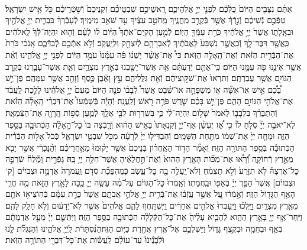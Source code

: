 \documentclass[twoside, openany, parskip=half, 11pt]{book}
\begin{document}
\begin{footnotesize}
\begin{multicols}{2}
\\
אַתֶּ֨ם נִצָּבִ֤ים הַיּוֹם֙ כֻּלְּֿכֶ֔ם לִפְנֵ֖י יְיָ֣ אֱלֹֽהֵיכֶ֑ם רָֽאשֵׁיכֶ֣ם שִׁבְטֵיכֶ֗ם זִקְנֵיכֶם֙ וְֿשֹׁ֣טְֿרֵיכֶ֔ם כֹּ֖ל אִ֥ישׁ יִשְׂרָאֵֽל׃ טַפְּֿכֶ֣ם נְֿשֵׁיכֶ֔ם וְֿגֵ֣רְֿךָ֔ אֲשֶׁ֖ר בְּֿקֶרֶ֣ב מַֽחֲנֶ֑יךָ מֵֽחֹטֵ֣ב עֵצֶ֔יךָ עַ֖ד שֹׁאֵ֥ב מֵימֶֽיךָ׃ לְֿעָבְֿרְךָ֗ בִּבְרִ֛ית יְיָ֥ אֱלֹהֶ֖יךָ וּבְאָֽלָת֑וֹ אֲשֶׁר֙ יְיָ֣ אֱלֹהֶ֔יךָ כֹּרֵ֥ת עִמְּֿךָ֖ הַיּֽוֹם׃
לְֿמַ֣עַן הָקִֽים־אֹֽתְֿךָ֩ הַיּ֨וֹם ל֜וֹ לְֿעָ֗ם וְֿה֤וּא יִֽהְיֶה־לְּֿךָ֙ לֵֽאלֹהִ֔ים כַּֽאֲשֶׁ֖ר דִּבֶּר־לָ֑ךְ וְֿכַֽאֲשֶׁ֤ר נִשְׁבַּע֙ לַֽאֲבֹתֶ֔יךָ לְֿאַבְרָהָ֥ם לְֿיִצְחָ֖ק וּֽלְיַֽעֲקֹֽב׃ וְֿלֹ֥א אִתְּֿכֶ֖ם לְֿבַדְּֿכֶ֑ם אָֽנֹכִ֗י כֹּרֵת֙ אֶת־הַבְּֿרִ֣ית הַזֹּ֔את וְֿאֶת־הָֽאָלָ֖ה הַזֹּֽאת׃ כִּי֩ אֶת־אֲשֶׁ֨ר יֶשְׁנ֜וֹ פֹּ֗ה עִמָּ֨נוּ֙ עֹמֵ֣ד הַיּ֔וֹם לִפְנֵ֖י יְיָ֣ אֱלֹהֵ֑ינוּ וְֿאֵ֨ת אֲשֶׁ֥ר אֵינֶ֛נּוּ פֹּ֖ה עִמָּ֥נוּ הַיּֽוֹם׃
כִּֽי־אַתֶּ֣ם יְֿדַעְתֶּ֔ם אֵ֥ת אֲשֶׁר־יָשַׁ֖בְנוּ בְּֿאֶ֣רֶץ מִצְרָ֑יִם וְֿאֵ֧ת אֲשֶׁר־עָבַ֛רְנוּ בְּֿקֶ֥רֶב הַגּוֹיִ֖ם אֲשֶׁ֥ר עֲבַרְתֶּֽם׃ וַתִּרְאוּ֙ אֶת־שִׁקּ֣וּצֵיהֶ֔ם וְֿאֵ֖ת גִּלֻּֽלֵיהֶ֑ם עֵ֣ץ וָאֶ֔בֶן כֶּ֥סֶף וְֿזָהָ֖ב אֲשֶׁ֥ר עִמָּהֶֽם׃ פֶּן־יֵ֣שׁ בָּ֠כֶ֠ם אִ֣ישׁ אֽוֹ־אִשָּׁ֞ה א֧וֹ מִשְׁפָּחָ֣ה אוֹ־שֵׁ֗בֶט אֲשֶׁר֩ לְֿבָב֨וֹ פֹנֶ֤ה הַיּוֹם֙ מֵעִם֙ יְיָ֣ אֱלֹהֵ֔ינוּ לָלֶ֣כֶת לַֽעֲבֹ֔ד אֶת־אֱלֹהֵ֖י הַגּוֹיִ֣ם הָהֵ֑ם פֶּן־יֵ֣שׁ בָּכֶ֗ם שֹׁ֛רֶשׁ פֹּרֶ֥ה רֹ֖אשׁ וְֿלַֽעֲנָֽה׃ וְֿהָיָ֡ה בְּֿשָׁמְֿעוֹ֩ אֶת־דִּבְרֵ֨י הָֽאָלָ֜ה הַזֹּ֗את וְֿהִתְבָּרֵ֨ךְ בִּלְבָב֤וֹ לֵאמֹר֙ שָׁל֣וֹם יִֽהְיֶה־לִּ֔י כִּ֛י בִּשְׁרִר֥וּת לִבִּ֖י אֵלֵ֑ךְ לְֿמַ֛עַן סְֿפ֥וֹת הָֽרָוָ֖ה אֶת־הַצְּֿמֵאָֽה׃ לֹֽא־יֹאבֶ֣ה יְיָ֘ סְֿלֹ֣חַ לוֹ֒ כִּ֣י אָ֠ז יֶעְשַׁ֨ן אַף־יְֿיָ֤ וְֿקִנְאָתוֹ֙ בָּאִ֣ישׁ הַה֔וּא וְֿרָ֤בְֿצָה בּוֹ֙ כׇּל־הָ֣אָלָ֔ה הַכְּֿתוּבָ֖ה בַּסֵּ֣פֶר הַזֶּ֑ה וּמָחָ֤ה יְיָ֙ אֶת־שְׁמ֔וֹ מִתַּ֖חַת הַשָּׁמָֽיִם׃ וְֿהִבְדִּיל֤וֹ יְיָ֙ לְֿרָעָ֔ה מִכֹּ֖ל שִׁבְטֵ֣י יִשְׂרָאֵ֑ל כְּֿכֹל֙ אָל֣וֹת הַבְּֿרִ֔ית הַכְּֿתוּבָ֕ה בְּֿסֵ֥פֶר הַתּוֹרָ֖ה הַזֶּֽה׃ וְֿאָמַ֞ר הַדּ֣וֹר הָאַֽחֲר֗וֹן בְּֿנֵיכֶם֙ אֲשֶׁ֤ר יָק֨וּמוּ֙ מֵאַ֣חֲרֵיכֶ֔ם וְֿהַ֨נָּכְֿרִ֔י אֲשֶׁ֥ר יָבֹ֖א מֵאֶ֣רֶץ רְֿחוֹקָ֑ה וְֿ֠רָא֠וּ אֶת־מַכּ֞וֹת הָאָ֤רֶץ הַהִוא֙ וְֿאֶת־תַּ֣חֲלֻאֶ֔יהָ אֲשֶׁר־חִלָּ֥ה יְיָ֖ בָּֽהּ׃ גָּפְֿרִ֣ית וָמֶ֘לַח֘ שְֿׂרֵפָ֣ה כׇל־אַרְצָהּ֒ לֹ֤א תִזָּרַע֙ וְֿלֹ֣א תַצְמִ֔חַ וְֿלֹא־יַֽעֲלֶ֥ה בָ֖הּ כׇּל־עֵ֑שֶׂב כְּֽֿמַהְפֵּכַ֞ת סְֿדֹ֤ם וַֽעֲמֹרָה֙ אַדְמָ֣ה וּצְבֹיִי֔ם [ק‘ וּצְבוֹיִ֔ם] אֲשֶׁר֙ הָפַ֣ךְ יְיָ֔ בְּֿאַפּ֖וֹ וּבַֽחֲמָתֽוֹ׃ וְֿאָֽמְֿרוּ֙ כׇּל־הַגּוֹיִ֔ם עַל־מֶ֨ה עָשָׂ֧ה יְיָ֛ כָּ֖כָה לָאָ֣רֶץ הַזֹּ֑את מֶ֥ה חֳרִ֛י הָאַ֥ף הַגָּד֖וֹל הַזֶּֽה׃ וְֿאָ֣מְֿר֔וּ עַ֚ל אֲשֶׁ֣ר עָֽזְֿב֔וּ אֶת־בְּֿרִ֥ית יְיָ֖ אֱלֹהֵ֣י אֲבֹתָ֑ם אֲשֶׁר֙ כָּרַ֣ת עִמָּ֔ם בְּֿהֽוֹצִיא֥וֹ אֹתָ֖ם מֵאֶ֥רֶץ מִצְרָֽיִם׃ וַיֵּֽלְֿכ֗וּ וַיַּֽעַבְדוּ֙ אֱלֹהִ֣ים אֲחֵרִ֔ים וַיִּֽשְׁתַּֽחֲו֖וּ לָהֶ֑ם אֱלֹהִים֙ אֲשֶׁ֣ר לֹֽא־יְֿדָע֔וּם וְֿלֹ֥א חָלַ֖ק לָהֶֽם׃ וַיִּֽחַר־אַ֥ף יְיָ֖ בָּאָ֣רֶץ הַהִ֑וא לְֿהָבִ֤יא עָלֶ֨יהָ֙ אֶת־כׇּל־הַקְּֿלָלָ֔ה הַכְּֿתוּבָ֖ה בַּסֵּ֥פֶר הַזֶּֽה׃ וַיִּתְּֿשֵׁ֤ם יְיָ֙ מֵעַ֣ל אַדְמָתָ֔ם בְּֿאַ֥ף וּבְחֵמָ֖ה וּבְקֶ֣צֶף גָּד֑וֹל וַיַּשְׁלִכֵ֛ם אֶל־אֶ֥רֶץ אֲחֶ֖רֶת כַּיּ֥וֹם הַזֶּֽה׃הַנִּ֨סְתָּרֹ֔ת לַֽיְֿיָ֖ אֱלֹהֵ֑ינוּ וְֿהַנִּגְלֹ֞ת לָֹ֤נֹוֹּ וֹּלְֹֿבָֹנֵֹ֨יֹנֹוֹּ֙ עַד־עוֹלָ֔ם לַֽעֲשׂ֕וֹת אֶת־כׇּל־דִּבְרֵ֖י הַתּוֹרָ֥ה הַזֹּֽאת׃


\end{multicols}
\end{footnotesize}
\end{document}
